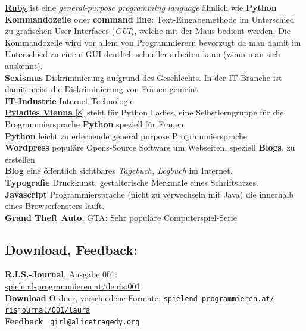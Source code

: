 \href{https://en.wikipedia.org/wiki/Ruby_(programming_language)}{\textbf{Ruby}} ist eine \textit{general-purpose programming language} ähnlich wie \textbf{Python} \\

\textbf{Kommandozeile} oder \textbf{command line}: Text-Eingabemethode im Unterschied zu grafischen User Interfaces (\textit{GUI}), welche mit der Maus bedient werden. Die Kommandozeile wird vor allem von Programmierern bevorzugt da man damit im Unterschied zu einem GUI deutlich schneller arbeiten kann (wenn man sich auskennt). \\

\href{https://de.wikipedia.org/wiki/Sexismus}{\textbf{Sexismus}} Diskriminierung aufgrund des Geschlechts. In der IT-Branche ist damit meist die Diskriminierung von Frauen gemeint. \\

\textbf{IT-Industrie} Internet-Technologie \\

\href{https://twitter.com/pyladies_vie}{\textbf{Pyladies Vienna} [8]} steht für Python Ladies, eine Selbstlerngruppe für die Programmiersprache  \textbf{Python} speziell für Frauen. \\

\href{http://python.org}{\textbf{Python}} leicht zu erlernende general purpose Programmiersprache \\

\textbf{Wordpress} populäre Opens-Source Software um Webseiten, speziell \textbf{Blogs}, zu erstellen \\

\textbf{Blog} eine öffentlich sichtbares \textit{Tagebuch, Logbuch} im Internet. \\

\textbf{Typografie} Druckkunst, gestalterische Merkmale eines Schriftsatzes. \\

\textbf{Javascript} Programmiersprache (nicht zu verwechseln mit Java) die innerhalb eines Browserfensters läuft. \\

\textbf{Grand Theft Auto}, GTA: Sehr populäre Computerspiel-Serie 

\subsection*{Download, Feedback:}
\textbf{R.I.S.-Journal}, Ausgabe 001: \\
\href{http://spielend-programmieren.at/de:ris:001}{spielend-programmieren.at/de:ris:001}\\
\textbf{Download} Ordner, verschiedene Formate: \href{http://spielend-programmieren.at/risjournal/001/laura}{\texttt{spielend-programmieren.at/\\risjournal/001/laura}} \\
\textbf{Feedback} \Letter\ \texttt{girl@alicetragedy.org} \\


